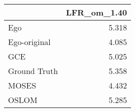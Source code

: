 \begin{tabular}{lr}
\toprule
{} & LFR_om_1.40 \\
\midrule
Ego          &       5.318 \\
Ego-original &       4.085 \\
GCE          &       5.025 \\
Ground Truth &       5.358 \\
MOSES        &       4.432 \\
OSLOM        &       5.285 \\
\bottomrule
\end{tabular}
